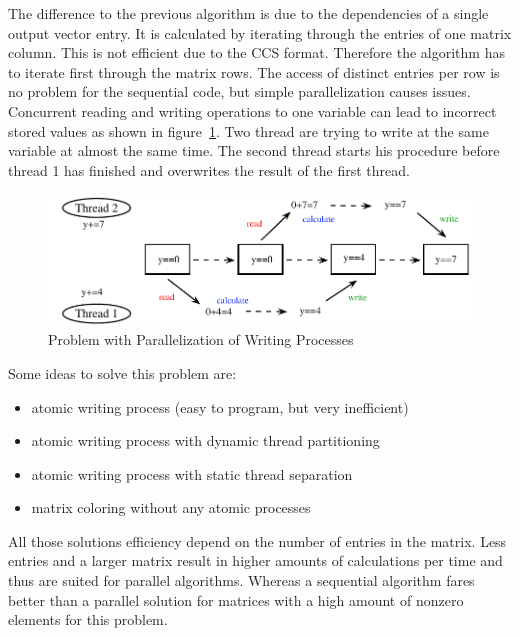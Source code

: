\documentclass[a4paper,11pt]{scrartcl}
\begin{document}
The difference to the previous algorithm is due to the dependencies of a single
output vector entry. It is calculated by iterating through the entries
of one matrix column. This is not efficient due to the CCS format.
Therefore the algorithm has to iterate first through the matrix rows.
The access of distinct entries per row is no problem for the sequential
code, but simple parallelization causes issues.
Concurrent reading and writing operations to one variable can lead to incorrect
stored values as shown in figure~\ref{figure:parallelwriting}. Two
thread are trying to write at the same variable at almost the same time. The
second thread starts his procedure before thread 1 has finished and overwrites the
result of the first thread.

\begin{figure}[ht]
\includegraphics{graphic/parallel_writing_problem.pdf}
\caption{Problem with Parallelization of Writing Processes}\label{figure:parallelwriting}
\end{figure}

\begin{samepage}
Some ideas to solve this problem are:
\begin{itemize}
\item atomic writing process (easy to program, but very inefficient)
\item atomic writing process with dynamic thread partitioning
\item atomic writing process with static thread separation
\item matrix coloring without any atomic processes
\end{itemize}
\end{samepage}

All those solutions efficiency depend on the number of entries in the matrix.
Less entries and a larger matrix result in higher amounts of calculations per
time and thus are suited for parallel algorithms.
Whereas a sequential algorithm fares better than a parallel solution for
matrices with a high amount of nonzero elements for this problem.
\end{document}
